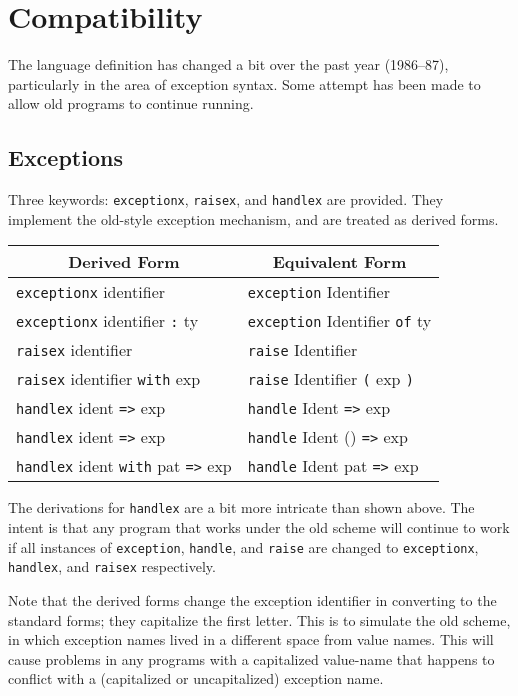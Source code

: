 \chapter{Compatibility}
The language definition has changed a bit over the past year
(1986--87), particularly in the area of exception syntax.  Some
attempt has been made to allow old programs to continue running.
\section{Exceptions}
Three keywords: \verb"exceptionx", \verb"raisex", and \verb"handlex"
are provided.  They implement the old-style exception mechanism, and
are treated as derived forms.
\begin{tabular}{@{}l l}
\multicolumn{1}{c}{\bf Derived Form}&
\multicolumn{1}{c}{\bf Equivalent Form} \\ \hline
\verb"exceptionx" identifier & \verb"exception" Identifier \\
\verb"exceptionx" identifier \verb":" ty & \verb"exception" Identifier \verb"of" ty \\

\verb"raisex" identifier & \verb"raise" Identifier \\
\verb"raisex" identifier \verb"with" exp& \verb"raise" Identifier \verb"(" exp \verb")" \\

\verb"handlex" ident \verb"=>" exp & \verb"handle" Ident \verb"=>" exp \\
\verb"handlex" ident \verb"=>" exp & \verb"handle" Ident () \verb"=>" exp \\

\verb"handlex" ident \verb"with" pat \verb"=>" exp & \verb"handle" Ident pat \verb"=>" exp \\
\hline
\end{tabular}

The derivations for \verb"handlex" are a bit more intricate than
shown above.  The intent is that any program that works under the old
scheme will continue to work if all instances of \verb"exception",
\verb"handle", and \verb"raise" are changed to 
 \verb"exceptionx", \verb"handlex", and \verb"raisex" respectively.

Note that the derived forms change the exception identifier in
converting to the standard forms; they capitalize the first letter.
This is to simulate the old scheme, in which exception names lived in
a different space from value names.  This will cause problems in any
programs with a capitalized value-name that happens to conflict with
a (capitalized or uncapitalized) exception name.
